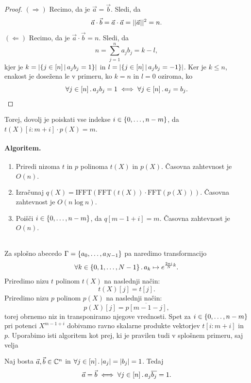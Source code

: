 \documentclass[11pt, a4paper]{article}
\begin{document}
\begin{proof}
    \((\Rightarrow)\) Recimo, da je \(\vec{a} = \vec{b}\). Sledi, da 
    \[
        \vec{a} \cdot \vec{b} = \vec{a} \cdot \vec{a} = ||\vec{a}||^2 = n.
    \]
    \((\Leftarrow)\) Recimo, da je \(\vec{a} \cdot \vec{b} = n\). Sledi, da 
    \[
        n = \sum_{j=1}^{n}a_jb_j = k - l,
    \]
    kjer je \(k = |\{j \in [n] \,|\, a_jb_j = 1\}|\) in \(l = |\{j \in [n] \,|\, a_jb_j = -1\}|\). Ker je \(k \leq n\), enakost je dosežena le v primeru, ko \(k = n\) in \(l = 0\) oziroma, ko 
    \[
        \forall j \in [n] \,.\, a_j b_j = 1 \iff \forall j \in [n] \,.\, a_j = b_j. \qedhere
    \]
\end{proof}
\noindent
Torej, dovolj je poiskati vse indekse \(i \in \{0, \ldots, n - m\}\), da \(t(X)[i : m + i] \cdot p(X) = m\).

\paragraph{Algoritem.}
\begin{enumerate}
    \item Priredi nizoma \(t\) in \(p\) polinoma \(t(X)\) in \(p(X)\). Časovna zahtevnost je \(O(n)\).
    \item Izračunaj \(q(X) = \text{IFFT}(\text{FFT}(t(X)) \cdot \text{FFT}(p(X)))\). Časovna zahtevnost je \(O(n \log n)\).
    \item Poišči \(i \in \{0, \ldots, n - m\}\), da \(q[m - 1 + i] = m\). Časovna zahtevnost je \(O(n)\).
\end{enumerate}
\
\\
Za splošno abecedo \(\Gamma = \{a_0, \ldots, a_{N - 1}\}\) pa naredimo transformacijo 
\[
    \forall k \in \{0, 1, \ldots, N-1\} \,.\, a_k \mapsto e^{\frac{2 \pi i}{N} k}.
\]
Priredimo nizu \(t\) polinom \(t(X)\) na naslednji način:
\[
    t(X)[j] = t[j].
\]
Priredimo nizu \(p\) polinom \(p(X)\) na naslednji način:
\[
    p(X)[j] = \overline{p[m - 1 - j]},
\]
torej obrnemo niz in transponiramo njegove vrednosti. Spet za \(i \in \{0, \ldots, n - m\}\) pri potenci \(X^{m - 1 + i}\) dobivamo ravno skalarne produkte vektorjev \(t[i : m + i]\) in \(p\). Uporabimo isti algoritem kot prej, ki je pravilen tudi v splošnem primeru, saj velja

\begin{lema}
    Naj bosta \(\vec{a}, \vec{b} \in \mathbb{C}^n\) in \(\forall j \in [n] \,.\, |a_j| = |b_j| = 1\). Tedaj
    \[
        \vec{a} = \vec{b} \iff  \forall j \in [n] \,.\, a_j \overline{b_j} = 1.
    \] 
\end{lema}
\end{document}
